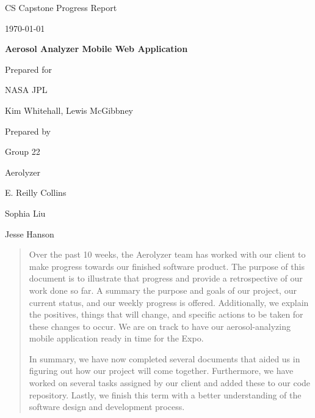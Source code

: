\documentclass[onecolumn, draftclsnofoot,10pt, compsoc]{IEEEtran}
\def \CapstoneTeamName{     Aerolyzer}
\def \CapstoneTeamNumber{       22}
\def \GroupMemberOne{           E. Reilly Collins}
\def \GroupMemberTwo{           Sophia Liu}
\def \GroupMemberThree{         Jesse Hanson}
\def \CapstoneProjectName{      Aerosol Analyzer Mobile Web Application}
\def \CapstoneSponsorCompany{   NASA JPL}
\def \CapstoneSponsorPerson{        Kim Whitehall, Lewis McGibbney}
\def \DocType{		%
				Progress Report
				}
\newcommand{\NameSigPair}[1]{\par
\makebox[2.75in][r]{#1} \hfil 	\makebox[3.25in]{\makebox[2.25in]{\hrulefill} \hfill		\makebox[.75in]{\hrulefill}}
\par\vspace{-12pt} \textit{\tiny\noindent
\makebox[2.75in]{} \hfil		\makebox[3.25in]{\makebox[2.25in][r]{Signature} \hfill	\makebox[.75in][r]{Date}}}}
\renewcommand{\NameSigPair}[1]{#1}
\begin{document}
\begin{titlepage}
    \begin{singlespace}
        \hfill 
        \par\vspace{.2in}
        \centering
        \scshape{
            \huge CS Capstone \DocType \par
            {\large\today}\par
            \vspace{.5in}
            \textbf{\Huge\CapstoneProjectName}\par
            \vfill
            {\large Prepared for}\par
            \Huge \CapstoneSponsorCompany\par
            \vspace{5pt}
            {\Large\NameSigPair{\CapstoneSponsorPerson}\par}
            {\large Prepared by }\par
            Group\CapstoneTeamNumber\par
            \CapstoneTeamName\par 
            \vspace{5pt}
            {\Large
                \NameSigPair{\GroupMemberOne}\par
                \NameSigPair{\GroupMemberTwo}\par
                \NameSigPair{\GroupMemberThree}\par
            }
            \vspace{18pt}
        }
        \begin{abstract}
        \noindent Over the past 10 weeks, the Aerolyzer team has worked with our client to make progress towards our finished software product. The purpose of this document is to illustrate that progress and provide a retrospective of our work done so far. A summary the purpose and goals of our project, our current status, and our weekly progress is offered. Additionally, we explain the positives, things that will change, and specific actions to be taken for these changes to occur. We are on track to have our aerosol-analyzing mobile application ready in time for the Expo.

        \medskip

        In summary, we have now completed several documents that aided us in figuring out how our project will come together. Furthermore, we have worked on several tasks assigned by our client and added these to our code repository.  Lastly, we finish this term with a better understanding of the software design and development process.
        \end{abstract}     
    \end{singlespace}
\end{titlepage}
\end{document}
